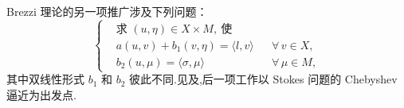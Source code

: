 Brezzi 理论的另一项推广涉及下列问题：
\[
  \left\{
  \begin{aligned}
    &\text{求 }(u,\eta)\in X\times M,\ \text{使}\\
    &a(u,v)+b_1(v,\eta)=\langle l,v\rangle&&\forall\,v\in X,\\
    &b_2(u,\mu)=\langle\sigma,\mu\rangle&&\forall\,\mu\in M,
  \end{aligned}
  \right.
\]
其中双线性形式 \(b_1\) 和 \(b_2\) 彼此不同.见及,后一项工作以 Stokes 问题的 Chebyshev 逼近为出发点.
